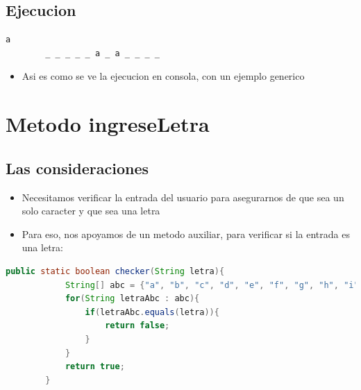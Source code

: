 \documentclass{article}
\begin{document}
    \subsection{Ejecucion}
    \begin{lstlisting}[language=bash, caption={Ejecucion del codigo}]
        a
        _ _ _ _ _ a _ a _ _ _ _
    \end{lstlisting}
    \begin{itemize}
        \item Asi es como se ve la ejecucion en consola, con un ejemplo generico
    \end{itemize}
    
    \section{Metodo ingreseLetra}
        \subsection{Las consideraciones}
        \begin{itemize}
            \item Necesitamos verificar la entrada del usuario para asegurarnos de que sea un solo caracter y que sea una letra
            \item Para eso, nos apoyamos de un metodo auxiliar, para verificar si la entrada es una letra:
        \end{itemize}
        \begin{lstlisting}[language=java, caption={metodo checker()}]
        public static boolean checker(String letra){
            String[] abc = {"a", "b", "c", "d", "e", "f", "g", "h", "i", "j", "k", "l", "m", "n", "o", "p", "q", "r", "s", "t", "u", "v", "w", "x", "y", "z"};
            for(String letraAbc : abc){
                if(letraAbc.equals(letra)){
                    return false;
                }
            }
            return true;
        }
    
        \end{lstlisting}
\end{document}
